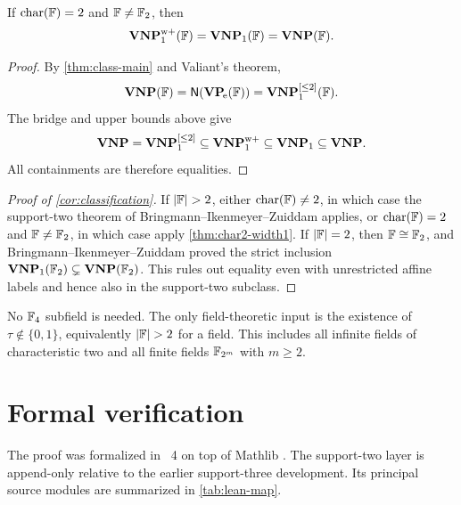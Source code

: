 \begin{theorem}\label{thm:char2-width1}
If \(\operatorname{char}(\mathbb{F})=2\) and \(\mathbb{F}\neq\mathbb{F}_2\), then
\[
 \mathbf{VNP}_{1}^{\mathrm{w}+}(\mathbb{F})=\mathbf{VNP}_{1}(\mathbb{F})=\mathbf{VNP}(\mathbb{F}).
\]
\end{theorem}

\begin{proof}
By \cref{thm:class-main} and Valiant's theorem,
\[
 \mathbf{VNP}(\mathbb{F})=\mathsf{N}(\mathbf{VP}_{\!\mathrm e}(\mathbb{F}))=\mathbf{VNP}_{1}^{[\le 2]}(\mathbb{F}).
\]
The bridge and upper bounds above give
\[
 \mathbf{VNP}
 =\mathbf{VNP}_{1}^{[\le 2]}
 \subseteq\mathbf{VNP}_{1}^{\mathrm{w}+}
 \subseteq\mathbf{VNP}_{1}
 \subseteq\mathbf{VNP}.
\]
All containments are therefore equalities.
\end{proof}

\begin{proof}[Proof of \cref{cor:classification}]
If \(|\F|>2\), either \(\operatorname{char}(\mathbb{F})\neq2\), in which case the support-two theorem of
Bringmann--Ikenmeyer--Zuiddam applies, or \(\operatorname{char}(\mathbb{F})=2\) and \(\mathbb{F}\neq\mathbb{F}_2\), in which
case apply \cref{thm:char2-width1}.  If \(|\mathbb{F}|=2\), then \(\mathbb{F}\cong\mathbb{F}_2\), and
Bringmann--Ikenmeyer--Zuiddam proved the strict inclusion
\(\mathbf{VNP}_{1}(\mathbb{F}_2)\subsetneq\mathbf{VNP}(\mathbb{F}_2)\).  This rules out equality even with unrestricted
affine labels and hence also in the support-two subclass.
\end{proof}

\begin{remark}
No \(\mathbb{F}_4\) subfield is needed.  The only field-theoretic input is the existence of
\(\tau\notin\{0,1\}\), equivalently \(|\F|>2\) for a field.  This includes all infinite
fields of characteristic two and all finite fields \(\mathbb{F}_{2^m}\) with \(m\ge2\).
\end{remark}

\section{Formal verification}\label{sec:formal}

The proof was formalized in \lean\ 4 \cite{Lean4} on top of Mathlib
\cite{Mathlib2020}.  The support-two layer is append-only relative to the earlier
support-three development.  Its principal source modules are summarized in
\cref{tab:lean-map}.

